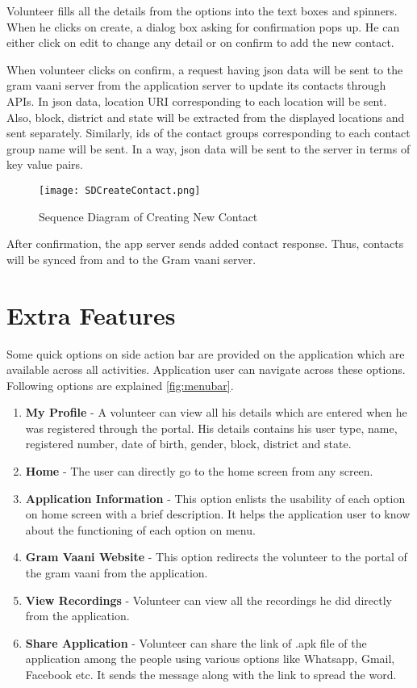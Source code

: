 \begin{itemize}
Volunteer fills all the details from the options into the text boxes and spinners. When he clicks on create, a dialog box asking for confirmation pops up. He can either click on edit to change any detail or on confirm to add the new contact.

When volunteer clicks on confirm, a request having json data will be sent to the  gram vaani server from the application server to update its contacts through APIs. In json data, location URI corresponding to each location will be sent. Also, block, district and state will be extracted from the displayed locations and sent separately. Similarly, ids of the contact groups corresponding to each contact group name will be sent. In a way, json data will be sent to the server in terms of key value pairs.

\begin{figure}[H]
    \centering
	\texttt{[image: SDCreateContact.png]}
    \caption{ Sequence Diagram of Creating New Contact}
    \label{fig:Sequence Diagram of Creating New Contact}
\end{figure}

 After confirmation, the app server sends added contact response. Thus, contacts will be synced from and to the Gram vaani server.

\section{Extra Features}

Some quick options on side action bar are provided on the application which are available across all activities. Application  user can navigate across these options. Following options are explained \ref{fig:menubar}.
\begin{enumerate}
\item \textbf {My Profile} - A volunteer can view all his details which are entered when he was registered through the portal. His details contains his user type, name, registered number, date of birth, gender, block, district and state.
\item \textbf{Home} - The user can directly go to the home screen from any screen.
\item \textbf{Application Information} - This option enlists the usability of each option on home screen with a brief description. It helps the application user to know about the functioning of each option on menu.
\item \textbf{Gram Vaani Website} - This option redirects the volunteer to the portal of the gram vaani from the application.
\item \textbf{View Recordings} - Volunteer can view all the recordings he did directly from the application.
\item \textbf{Share Application} - Volunteer can share the link of .apk file of the application among the people using various options like Whatsapp, Gmail, Facebook etc. It sends the message along with the link to spread the word.
\end{enumerate}



\end{itemize}
